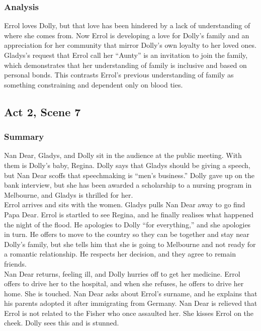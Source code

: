 \documentclass[a4paper]{article}
\begin{document}
\subsubsection{Analysis}
Errol loves Dolly, but that love has been hindered by a lack of
understanding of where she comes from. Now Errol is developing a
love for Dolly’s family and an appreciation for her community that
mirror Dolly’s own loyalty to her loved ones. Gladys’s request that
Errol call her “Aunty” is an invitation to join the family, which
demonstrates that her understanding of family is inclusive and
based on personal bonds. This contrasts Errol’s previous
understanding of family as something constraining and dependent
only on blood ties.\\

\subsection{Act 2, Scene 7}
\subsubsection{Summary}
Nan Dear, Gladys, and Dolly sit in the audience at the public
meeting. With them is Dolly’s baby, Regina. Dolly says that
Gladys should be giving a speech, but Nan Dear scoffs that
speechmaking is “men’s business.” Dolly gave up on the bank
interview, but she has been awarded a scholarship to a nursing
program in Melbourne, and Gladys is thrilled for her.\\

Errol arrives and sits with the women. Gladys pulls Nan Dear
away to go find Papa Dear. Errol is startled to see Regina, and
he finally realises what happened the night of the flood. He
apologies to Dolly “for everything,” and she apologies in turn.
He offers to move to the country so they can be together and
stay near Dolly’s family, but she tells him that she is going to
Melbourne and not ready for a romantic relationship. He
respects her decision, and they agree to remain friends.\\

Nan Dear returns, feeling ill, and Dolly hurries off to get her
medicine. Errol offers to drive her to the hospital, and when she
refuses, he offers to drive her home. She is touched. Nan Dear
asks about Errol’s surname, and he explains that his parents
adopted it after immigrating from Germany. Nan Dear is
relieved that Errol is not related to the Fisher who once
assaulted her. She kisses Errol on the cheek. Dolly sees this and
is stunned.\\
\end{document}
